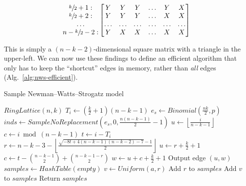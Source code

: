 \documentclass[a4paper,num-refs,gigabyte]{oup-contemporary}
\begin{document}
\begin{equation}
\begin{matrix}
\sfrac{k}{2}+1:\\
\sfrac{k}{2}+2:\\
\ldots\\
n-\sfrac{k}{2}-2:\\
\end{matrix}
\begin{bmatrix}
Y & Y & Y & \ldots & Y & X\\
Y & Y & Y & \ldots & X & X\\
\ldots & \ldots & \ldots & \ldots & \ldots & \ldots\\
Y & X & X & \ldots & X & X\\
\end{bmatrix}
\end{equation}

This is simply a $\left(n-k-2\right)$-dimensional square matrix with a triangle in the upper-left. We can now use these findings to define an efficient algorithm that only has to keep the ``shortcut'' edges in memory, rather than \textit{all} edges (Alg.~\ref{alg:nws-efficient}).

\begin{algorithm}[H]
\caption{Sample Newman--Watts--Strogatz model}
\label{alg:nws-efficient}
\begin{algorithmic}[1]
  \State $RingLattice\left(n,k\right)$
  \State $T_i\gets\left(\frac{k}{2}+1\right)\left(n-k-1\right)$
  \State $e_s\gets Binomial\left(\frac{nk}{2},p\right)$
  \State $inds\gets SampleNoReplacement\left(e_s,0,\frac{n\left(n-k-1\right)}{2}-1\right)$
      \State $u\gets\left\lfloor\frac{i}{n-k-1}\right\rfloor$
      \State $c\gets i\bmod \left(n-k-1\right)$
    \Else{}
      \State $t\gets i-T_i$
      \State $r\gets n-k-3-\left\lfloor\frac{\sqrt{-8t+4\left(n-k-1\right)\left(n-k-2\right)-7}-1}{2}\right\rfloor$
      \State $u\gets r+\frac{k}{2}+1$
      \State $c\gets t-{n-k-1\choose2}+{n-k-1-r\choose2}$
    \EndIf
    \State $w\gets u+c+\frac{k}{2}+1$
    \State Output edge $\left(u,w\right)$
  \EndFor
\EndProcedure
~\\
  \State $samples\gets HashTable\left(empty\right)$
    \State $v\gets Uniform\left(a,r\right)$
      \State Add $r$ to $samples$
    \Else
      \State Add $v$ to $samples$
    \EndIf
  \EndFor
  \State Return $samples$
\EndProcedure
\end{algorithmic}
\end{algorithm}
\end{document}
